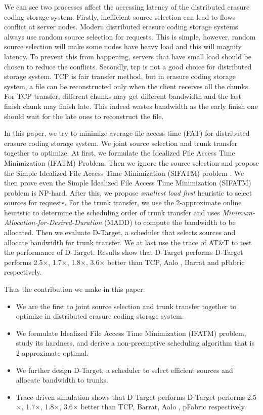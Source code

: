 \documentclass{IEEEtran}
\begin{document}
We can see two processes affect the accessing latency of the distributed erasure coding storage system.
Firstly, inefficient source selection can lead to flows conflict at server nodes.
Modern distributed erasure coding storage systems always use random source selection for requests. 
This is simple, however, random source selection will make some nodes have heavy load and this will magnify latency.
To prevent this from happening, servers that have small load should be chosen to reduce the conflicts.
Secondly, tcp is not a good choice for distributed storage system.  
TCP is fair transfer method, but in erasure coding storage system, a file can be reconstructed only when the client receives all the chunks. 
For TCP transfer,  different chunks may get different bandwidth and the last finish chunk may finish late. 
This indeed wastes bandwidth as the early finish one should wait for the late ones to reconstruct the file.

In this paper, we try to minimize average file access time (FAT) for distributed erasure coding storage system.
We joint source selection and trunk transfer together to optimize.
At first, we formulate the Idealized File Access Time Minimization (IFATM) Problem.
Then we ignore the source selection and propose the Simple Idealized File Access Time Minimization (SIFATM) problem . 
We then prove even the Simple Idealized File Access Time Minimization (SIFATM) problem is NP-hard.
After this, we propose {\em smallest load first} heuristic to select sources for requests.
For the trunk transfer, we use the 2-approximate online heuristic to determine the scheduling order of trunk transfer and uses {\em Minimum-Allocation-for-Desired-Duration} (MADD) to compute the bandwidth to be allocated.
Then we evaluate D-Target, a scheduler that selects sources and allocate bandwidth for trunk transfer.
We at last use the trace of AT$\&$T to test the performance of D-Target.
Results show that D-Target performs D-Target performs 2.5$\times$, 1.7$\times$, 1.8$\times$, 3.6$\times$ better than TCP,   Aalo \cite{chowdhury2015efficient}, Barrat\cite{dogar2014decentralized} and pFabric\cite{pFabric} respectively.

Thus the contribution we make in this paper:
\begin{itemize}[]
\item We are the first to joint source selection and trunk transfer together to optimize in distributed erasure coding storage system.
\item We formulate Idealized File Access Time Minimization (IFATM)  problem, study its hardness, and derive a non-preemptive scheduling algorithm that is 2-approximate optimal. 
\item We further design D-Target, a scheduler to select efficient sources and allocate bandwidth to trunks.
\item Trace-driven simulation shows that D-Target performs D-Target performs 2.5$\times$, 1.7$\times$, 1.8$\times$, 3.6$\times$ better than TCP,  Barrat\cite{dogar2014decentralized}, Aalo \cite{chowdhury2015efficient}, pFabric\cite{pFabric} respectively.

\end{itemize}
\end{document}
